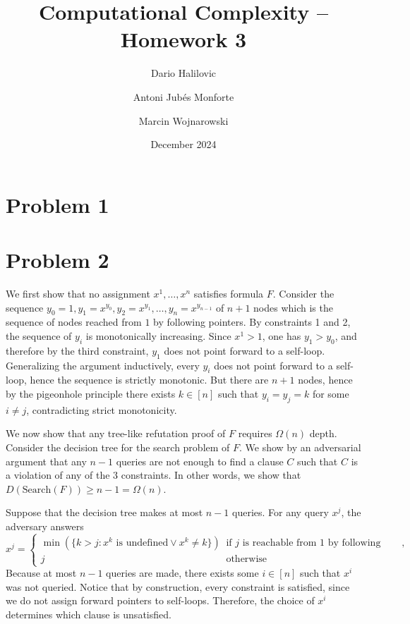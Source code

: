 \documentclass{article}
\title{Computational Complexity -- Homework 3}
\author{Dario Halilovic\and
Antoni Jubés Monforte\and
Marcin Wojnarowski}
\date{December 2024}
\begin{document}
\maketitle

\section*{Problem 1}

\section*{Problem 2}

We first show that no assignment $x^{1}, \ldots, x^{n}$
satisfies formula $F$. Consider the sequence $y_0 = 1, y_1 = x^{y_0}, y_2
= x^{y_1}, \ldots, y_{n} = x^{y_{n-1}}$ of $n+1$ nodes which is the sequence of
nodes reached from $1$ by following pointers. By constraints 1 and 2, the
sequence of $y_i$ is monotonically increasing. Since $x^1 > 1$, one has $y_1
> y_0$, and therefore by the third constraint, $y_1$ does not point forward to
a self-loop. Generalizing the argument inductively, every $y_i$ does not point
forward to a self-loop, hence the sequence is strictly monotonic. But there are
$n+1$ nodes, hence by the pigeonhole principle there exists $k \in [n]$ such
that $y_i = y_j = k$ for some $i \neq j$, contradicting strict monotonicity.

We now show that any tree-like refutation proof of $F$ requires $\Omega(n)$
depth. Consider the decision tree for the search problem of $F$. We show by an
adversarial argument that any $n - 1$ queries are not enough to find a clause
$C$ such that $C$ is a violation of any of the 3 constraints. In other words, we
show that $D(\textrm{Search}(F)) \geq n - 1 = \Omega(n)$.

Suppose that the decision tree makes at most $n - 1$ queries. For any query
$x^{j}$, the adversary answers
\[
x^j = \begin{cases}
	\min(\{k > j : x^k \textrm{ is undefined} \lor x^k \neq k\}) & \textrm{if
	} j \textrm{ is reachable from 1 by following pointers}, \\
	j & \textrm{otherwise}
\end{cases}
\]
Because at most $n - 1$ queries are made, there exists some $i \in [n]$ such
that $x^i$ was not queried. Notice that by construction, every constraint is
satisfied, since we do not assign forward pointers to self-loops. Therefore, the
choice of $x^i$ determines which clause is unsatisfied.
\end{document}
